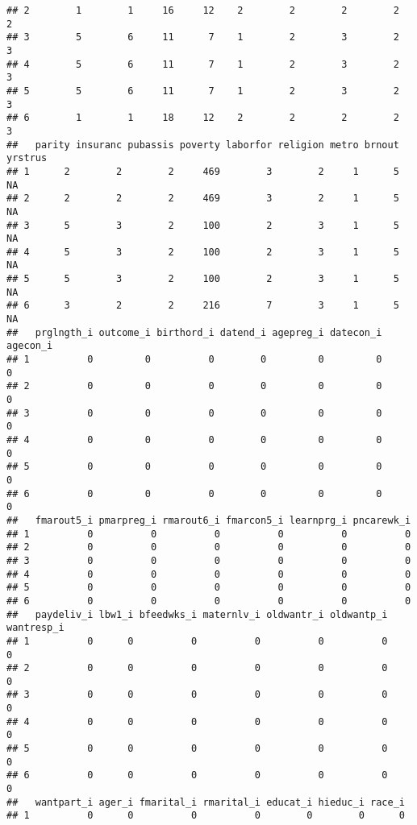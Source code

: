 \documentclass[]{article}
\begin{document}
\begin{verbatim}
## 2        1        1     16     12    2        2        2        2       2
## 3        5        6     11      7    1        2        3        2       3
## 4        5        6     11      7    1        2        3        2       3
## 5        5        6     11      7    1        2        3        2       3
## 6        1        1     18     12    2        2        2        2       3
##   parity insuranc pubassis poverty laborfor religion metro brnout yrstrus
## 1      2        2        2     469        3        2     1      5      NA
## 2      2        2        2     469        3        2     1      5      NA
## 3      5        3        2     100        2        3     1      5      NA
## 4      5        3        2     100        2        3     1      5      NA
## 5      5        3        2     100        2        3     1      5      NA
## 6      3        2        2     216        7        3     1      5      NA
##   prglngth_i outcome_i birthord_i datend_i agepreg_i datecon_i agecon_i
## 1          0         0          0        0         0         0        0
## 2          0         0          0        0         0         0        0
## 3          0         0          0        0         0         0        0
## 4          0         0          0        0         0         0        0
## 5          0         0          0        0         0         0        0
## 6          0         0          0        0         0         0        0
##   fmarout5_i pmarpreg_i rmarout6_i fmarcon5_i learnprg_i pncarewk_i
## 1          0          0          0          0          0          0
## 2          0          0          0          0          0          0
## 3          0          0          0          0          0          0
## 4          0          0          0          0          0          0
## 5          0          0          0          0          0          0
## 6          0          0          0          0          0          0
##   paydeliv_i lbw1_i bfeedwks_i maternlv_i oldwantr_i oldwantp_i wantresp_i
## 1          0      0          0          0          0          0          0
## 2          0      0          0          0          0          0          0
## 3          0      0          0          0          0          0          0
## 4          0      0          0          0          0          0          0
## 5          0      0          0          0          0          0          0
## 6          0      0          0          0          0          0          0
##   wantpart_i ager_i fmarital_i rmarital_i educat_i hieduc_i race_i
## 1          0      0          0          0        0        0      0

\end{verbatim}
\end{document}
